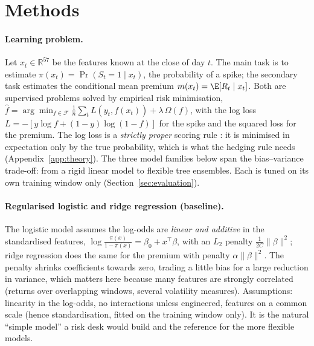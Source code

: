 \section{Methods}\label{sec:methods}

\paragraph{Learning problem.} Let $x_t\in\mathbb{R}^{57}$ be the features known at the close of day $t$.
The main task is to estimate $\pi(x_t)=\Pr(S_t=1\mid x_t)$, the probability of a spike; the secondary
task estimates the conditional mean premium $m(x_t)=\E[R_t\mid x_t]$. Both are supervised problems
solved by empirical risk minimisation, $\hat f=\arg\min_{f\in\mathcal F}\frac1n\sum_t L(y_t,f(x_t))+\lambda\,\Omega(f)$,
with the log loss $L=-[y\log f+(1-y)\log(1-f)]$ for the spike and the squared loss for the premium.
The log loss is a \emph{strictly proper} scoring rule \citep{gneiting2007}: it is minimised in expectation
only by the true probability, which is what the hedging rule needs (Appendix~\ref{app:theory}).
The three model families below span the bias--variance trade-off: from a rigid linear model to flexible
tree ensembles. Each is tuned on its own training window only (Section~\ref{sec:evaluation}).

\paragraph{Regularised logistic and ridge regression (baseline).} The logistic model assumes the
log-odds are \emph{linear and additive} in the standardised features,
$\log\frac{\pi(x)}{1-\pi(x)}=\beta_0+x^\top\beta$, with an $L_2$ penalty $\frac{1}{2C}\lVert\beta\rVert^2$; ridge
regression does the same for the premium with penalty $\alpha\lVert\beta\rVert^2$. The penalty shrinks
coefficients towards zero, trading a little bias for a large reduction in variance, which matters here
because many features are strongly correlated (returns over overlapping windows, several volatility
measures). Assumptions: linearity in the log-odds, no interactions unless engineered, features on a common
scale (hence standardisation, fitted on the training window only). It is the natural ``simple model'' a
risk desk would build and the reference for the more flexible models.

